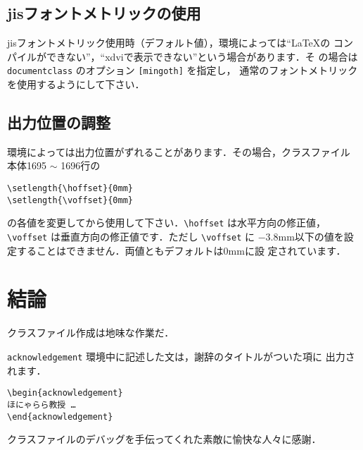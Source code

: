 \documentclass[mingoth]{kut-paper}		%
\begin{document}
 \section{jisフォントメトリックの使用}
 jisフォントメトリック使用時（デフォルト値），環境によっては``\LaTeX{}の
 コンパイルができない''，``xdviで表示できない''という場合があります．そ
 の場合は \verb|documentclass| のオプション \verb|[mingoth]| を指定し，
 通常のフォントメトリックを使用するようにして下さい．
 
 \section{出力位置の調整}
 環境によっては出力位置がずれることがあります．その場合，クラスファイル
 本体1695 $\sim$ 1696行の
\begin{verbatim}
\setlength{\hoffset}{0mm}
\setlength{\voffset}{0mm}
\end{verbatim}
 の各値を変更してから使用して下さい．\verb|\hoffset| は水平方向の修正値，
 \verb|\voffset| は垂直方向の修正値です．ただし \verb|\voffset| に
 $-3.8$mm以下の値を設定することはできません．両値ともデフォルトは0mmに設
 定されています．


\chapter{結論}
クラスファイル作成は地味な作業だ．


\begin{acknowledgement}
 \verb|acknowledgement| 環境中に記述した文は，謝辞のタイトルがついた項に
 出力されます．
\begin{verbatim}
\begin{acknowledgement}
ほにゃらら教授 …
\end{acknowledgement}
\end{verbatim}

 クラスファイルのデバッグを手伝ってくれた素敵に愉快な人々に感謝．
\end{acknowledgement}

\end{document}
